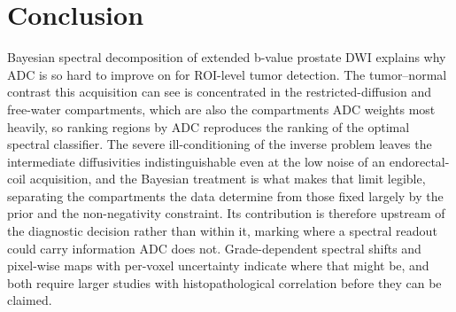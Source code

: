 \section{Conclusion}
Bayesian spectral decomposition of extended b-value prostate DWI explains why ADC is so hard to improve on for ROI-level tumor detection. The tumor--normal contrast this acquisition can see is concentrated in the restricted-diffusion and free-water compartments, which are also the compartments ADC weights most heavily, so ranking regions by ADC reproduces the ranking of the optimal spectral classifier.
The severe ill-conditioning of the inverse problem leaves the intermediate diffusivities indistinguishable even at the low noise of an endorectal-coil acquisition, and the Bayesian treatment is what makes that limit legible, separating the compartments the data determine from those fixed largely by the prior and the non-negativity constraint.
Its contribution is therefore upstream of the diagnostic decision rather than within it, marking where a spectral readout could carry information ADC does not. Grade-dependent spectral shifts and pixel-wise maps with per-voxel uncertainty indicate where that might be, and both require larger studies with histopathological correlation before they can be claimed.
